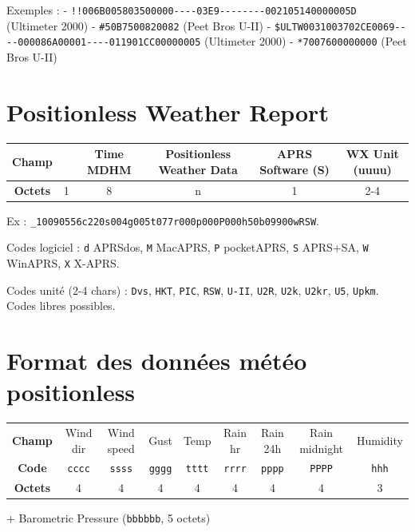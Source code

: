 Exemples : -
\texttt{!!006B005803500000-\/-\/-\/-03E9-\/-\/-\/-\/-\/-\/-\/-002105140000005D}
(Ultimeter 2000) - \texttt{\#50B7500820082} (Peet Bros U-II) -
\texttt{\$ULTW0031003702CE0069-\/-\/-\/-000086A00001-\/-\/-\/-011901CC00000005}
(Ultimeter 2000) - \texttt{*7007600000000} (Peet Bros U-II)

\section{Positionless Weather
Report}\label{positionless-weather-report}

\begin{center}
\begin{tabular}{|c|c|c|c|c|c|}
\hline
\textbf{Champ} & \lit{\_} & Time MDHM & Positionless Weather Data & APRS Software (S) & WX Unit (uuuu) \\
\hline
\textbf{Octets} & 1 & 8 & n & 1 & 2-4 \\
\hline
\end{tabular}
\end{center}

Ex : \texttt{\_10090556c220s004g005t077r000p000P000h50b09900wRSW}.

Codes logiciel : \texttt{d} APRSdos, \texttt{M} MacAPRS, \texttt{P}
pocketAPRS, \texttt{S} APRS+SA, \texttt{W} WinAPRS, \texttt{X} X-APRS.

Codes unité (2-4 chars) : \texttt{Dvs}, \texttt{HKT}, \texttt{PIC},
\texttt{RSW}, \texttt{U-II}, \texttt{U2R}, \texttt{U2k}, \texttt{U2kr},
\texttt{U5}, \texttt{Upkm}. Codes libres possibles.

\section{Format des données météo
positionless}\label{format-des-donnuxe9es-muxe9tuxe9o-positionless}

\begin{center}
\begin{tabular}{|c|c|c|c|c|c|c|c|c|}
\hline
\textbf{Champ} & Wind dir & Wind speed & Gust & Temp & Rain hr & Rain 24h & Rain midnight & Humidity \\
\textbf{Code} & \texttt{cccc} & \texttt{ssss} & \texttt{gggg} & \texttt{tttt} & \texttt{rrrr} & \texttt{pppp} & \texttt{PPPP} & \texttt{hhh} \\
\textbf{Octets} & 4 & 4 & 4 & 4 & 4 & 4 & 4 & 3 \\
\hline
\end{tabular}
\end{center}
\noindent + Barometric Pressure (\texttt{bbbbbb}, 5 octets)


